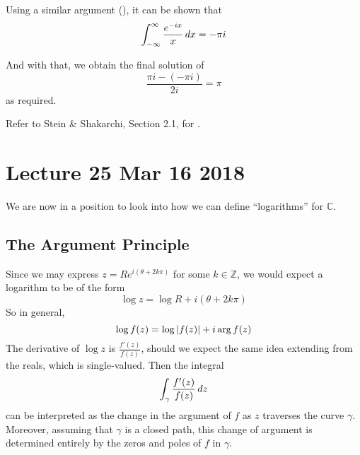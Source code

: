 \documentclass[notoc,notitlepage]{tufte-book}
\begin{document}
\begin{ex}
  Using a similar argument (), it can be shown that
  \begin{equation*}
    \int_{-\infty}^{\infty} \frac{e^{-ix}}{x} \mathop{}\!d{x} = - \pi i
  \end{equation*}

  And with that, we obtain the final solution of
  \begin{equation*}
    \frac{\pi i - (- \pi i)}{2i} = \pi
  \end{equation*}
  as required.
\end{ex}

Refer to Stein \& Shakarchi, Section 2.1, for .



\chapter{Lecture 25 Mar 16 2018}
  \label{chapter:lecture_25_mar_16_2018}

We are now in a position to look into how we can define ``logarithms'' for $\mathbb{C}$.

\section{The Argument Principle} %
\label{sec:the_argument_principle}

Since we may express $z = Re^{i (\theta + 2k \pi)}$ for some $k \in \mathbb{Z}$, we would expect a logarithm to be of the form
\begin{equation*}
  \log z = \log R + i (\theta + 2k \pi)
\end{equation*}
So in general,
\begin{equation*}
  \log f(z) = \log \left|f(z)\right| + i \arg{f(z)}
\end{equation*}
The derivative of $\log z$ is $\frac{f'(z)}{f(z)}$, should we expect the same idea extending from the reals, which is single-valued. Then the integral
\begin{equation*}
  \int_{\gamma} \frac{f'(z)}{f(z)} \mathop{}\!d{z} 
\end{equation*}
can be interpreted as the change in the argument of $f$ as $z$ traverses the curve $\gamma$. Moreover, assuming that $\gamma$ is a closed path, this change of argument is determined entirely by the zeros and poles of $f$ in $\gamma$. 
\end{document}
